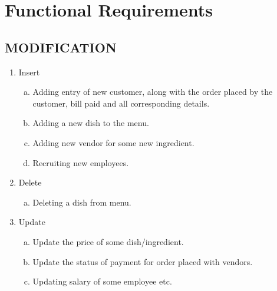 \section{Functional Requirements} \label{cap:funreq}
\subsection{MODIFICATION}
    \begin{enumerate}
        \item Insert
        \begin{enumerate}[(a)]
            \item Adding entry of new customer, along with the order placed by the customer, bill paid and all corresponding details.
            \item Adding a new dish to the menu.
            \item Adding new vendor for some new ingredient.
            \item Recruiting new employees.
        \end{enumerate}
        \item Delete
        \begin{enumerate}[(a)]
            \item Deleting a dish from menu.
        \end{enumerate}
        \item Update
        \begin{enumerate}[(a)]
            \item Update the price of some dish/ingredient.
            \item Update the status of payment for order placed with vendors.
            \item Updating salary of some employee etc.
        \end{enumerate}
    \end{enumerate}
